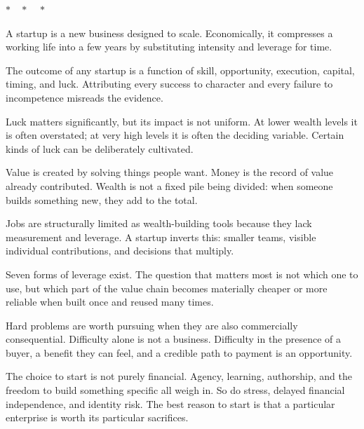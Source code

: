 \bigskip
\begin{center}{\small $\ast\quad\ast\quad\ast$}\end{center}

\clearpage

\begin{LessonReview}
  \item A startup is a new business designed to scale. Economically, it compresses a working life into a few years by substituting intensity and leverage for time.
  \item The outcome of any startup is a function of skill, opportunity, execution, capital, timing, and luck. Attributing every success to character and every failure to incompetence misreads the evidence.
  \item Luck matters significantly, but its impact is not uniform. At lower wealth levels it is often overstated; at very high levels it is often the deciding variable. Certain kinds of luck can be deliberately cultivated.
  \item Value is created by solving things people want. Money is the record of value already contributed. Wealth is not a fixed pile being divided: when someone builds something new, they add to the total.
  \item Jobs are structurally limited as wealth-building tools because they lack measurement and leverage. A startup inverts this: smaller teams, visible individual contributions, and decisions that multiply.
  \item Seven forms of leverage exist. The question that matters most is not which one to use, but which part of the value chain becomes materially cheaper or more reliable when built once and reused many times.
  \item Hard problems are worth pursuing when they are also commercially consequential. Difficulty alone is not a business. Difficulty in the presence of a buyer, a benefit they can feel, and a credible path to payment is an opportunity.
  \item The choice to start is not purely financial. Agency, learning, authorship, and the freedom to build something specific all weigh in. So do stress, delayed financial independence, and identity risk. The best reason to start is that a particular enterprise is worth its particular sacrifices.
\end{LessonReview}
